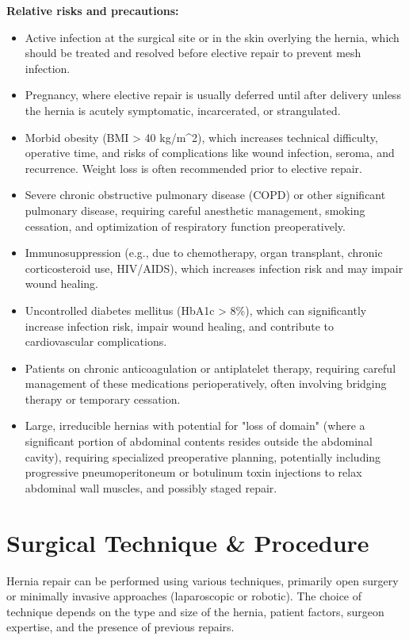 \textbf{Relative risks and precautions:}
\begin{itemize}
  \item Active infection at the surgical site or in the skin overlying the hernia, which should be treated and resolved before elective repair to prevent mesh infection.
  
  \item Pregnancy, where elective repair is usually deferred until after delivery unless the hernia is acutely symptomatic, incarcerated, or strangulated.
  
  \item Morbid obesity (BMI > 40 kg/m\textasciicircum{}2), which increases technical difficulty, operative time, and risks of complications like wound infection, seroma, and recurrence. Weight loss is often recommended prior to elective repair.
  
  \item Severe chronic obstructive pulmonary disease (COPD) or other significant pulmonary disease, requiring careful anesthetic management, smoking cessation, and optimization of respiratory function preoperatively.
  
  \item Immunosuppression (e.g., due to chemotherapy, organ transplant, chronic corticosteroid use, HIV/AIDS), which increases infection risk and may impair wound healing.
  
  \item Uncontrolled diabetes mellitus (HbA1c > 8\%), which can significantly increase infection risk, impair wound healing, and contribute to cardiovascular complications.
  
  \item Patients on chronic anticoagulation or antiplatelet therapy, requiring careful management of these medications perioperatively, often involving bridging therapy or temporary cessation.
  
  \item Large, irreducible hernias with potential for "loss of domain" (where a significant portion of abdominal contents resides outside the abdominal cavity), requiring specialized preoperative planning, potentially including progressive pneumoperitoneum or botulinum toxin injections to relax abdominal wall muscles, and possibly staged repair.
\end{itemize}

\section*{Surgical Technique \& Procedure}
Hernia repair can be performed using various techniques, primarily open surgery or minimally invasive approaches (laparoscopic or robotic). The choice of technique depends on the type and size of the hernia, patient factors, surgeon expertise, and the presence of previous repairs.

